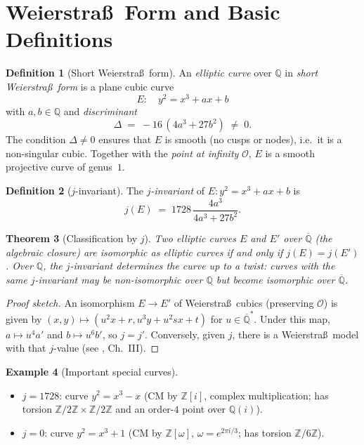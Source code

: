 \documentclass[12pt,a4paper]{amsart}
\newtheorem{theorem}{Theorem}[section]
\theoremstyle{definition}
\newtheorem{definition}[theorem]{Definition}
\newtheorem{example}[theorem]{Example}
\newcommand{\Z}{\mathbb{Z}}
\newcommand{\Q}{\mathbb{Q}}
\begin{document}
\section{Weierstra\ss\ Form and Basic Definitions}

\begin{definition}[Short Weierstra\ss\ form]
\label{def:weierstrass}
An \emph{elliptic curve} over $\Q$ in \emph{short Weierstra\ss\ form} is
a plane cubic curve
\[
  E: \quad y^2 = x^3 + ax + b
\]
with $a, b \in \Q$ and \emph{discriminant}
\[
  \Delta \;=\; -16\,(4a^3 + 27b^2) \;\ne\; 0.
\]
The condition $\Delta \ne 0$ ensures that $E$ is smooth (no cusps or nodes),
i.e.\ it is a non-singular cubic.  Together with the \emph{point at infinity}
$\mathcal{O}$, $E$ is a smooth projective curve of genus~$1$.
\end{definition}

\begin{definition}[$j$-invariant]
\label{def:j_invariant}
The \emph{$j$-invariant} of $E: y^2 = x^3 + ax + b$ is
\[
  j(E) \;=\; 1728\,\frac{4a^3}{4a^3 + 27b^2}.
\]
\end{definition}

\begin{theorem}[Classification by $j$]
\label{thm:j_classification}
Two elliptic curves $E$ and $E'$ over $\overline{\Q}$ (the algebraic closure)
are isomorphic as elliptic curves if and only if $j(E) = j(E')$.
Over $\Q$, the $j$-invariant determines the curve up to a \emph{twist}:
curves with the same $j$-invariant may be non-isomorphic over $\Q$ but
become isomorphic over $\overline{\Q}$.
\end{theorem}

\begin{proof}[Proof sketch]
An isomorphism $E \to E'$ of Weierstra\ss\ cubics (preserving $\mathcal{O}$)
is given by $(x,y) \mapsto (u^2 x + r, u^3 y + u^2 sx + t)$ for
$u \in \overline{\Q}^*$.  Under this map, $a \mapsto u^4 a'$ and
$b \mapsto u^6 b'$, so $j = j'$.  Conversely, given $j$, there is a
Weierstra\ss\ model with that $j$-value (see \cite{Silverman1986}, Ch.~III).
\end{proof}

\begin{example}[Important special curves]
\begin{itemize}
  \item $j = 1728$: curve $y^2 = x^3 - x$ (CM by $\Z[i]$, complex multiplication;
    has torsion $\Z/2\Z \times \Z/2\Z$ and an order-$4$ point over $\Q(i)$).
  \item $j = 0$: curve $y^2 = x^3 + 1$ (CM by $\Z[\omega]$, $\omega = e^{2\pi i/3}$;
    has torsion $\Z/6\Z$).
\end{itemize}
\end{example}
\end{document}
